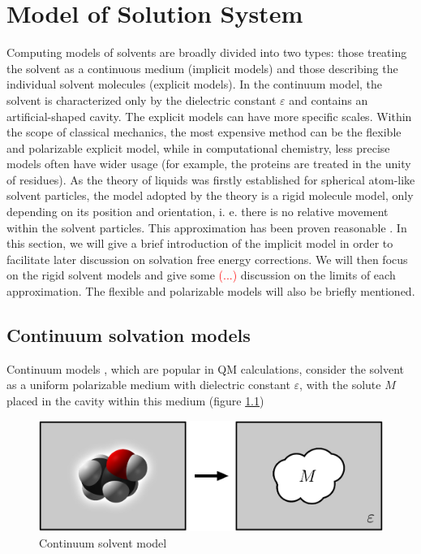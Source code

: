 
\chapter{Model of Solution System\label{chpt:models}}

Computing models of solvents are broadly divided into two types: those
treating the solvent as a continuous medium (implicit models) and
those describing the individual solvent molecules (explicit models).
In the continuum model, the solvent is characterized only by the dielectric
constant $\varepsilon$ and contains an artificial-shaped cavity.
The explicit models can have more specific scales. Within the scope
of classical mechanics, the most expensive method can be the flexible
and polarizable explicit model, while in computational chemistry,
less precise models often have wider usage (for example, the proteins
are treated in the unity of residues). As the theory of liquids was
firstly established for spherical atom-like solvent particles, the
model adopted by the theory is a rigid molecule model, only depending
on its position and orientation, i. e. there is no relative movement
within the solvent particles. This approximation has been proven reasonable
\citep{Gray-Gubbins}. In this section, we will give a brief introduction
of the implicit model in order to facilitate later discussion on solvation
free energy corrections. We will then focus on the rigid solvent models
and give some \textcolor{red}{(...)} discussion on the limits of each
approximation. The flexible and polarizable models will also be briefly
mentioned.


\section{Continuum solvation models}

Continuum models \citep{Jensen,Cramer_1999,Tomasi_1994_implicit_model},
which are popular in QM calculations, consider the solvent as a uniform
polarizable medium with dielectric constant $\varepsilon$, with the solute $M$ placed in the cavity within this medium (figure
\ref{fig:Reaction-field-model}) 

\begin{figure}[h]
\begin{centering}
\includegraphics[width=0.72\columnwidth]{_figure/reaction-field-model_2}
\par\end{centering}

\caption{Continuum solvent model\label{fig:Reaction-field-model}}
\end{figure}


